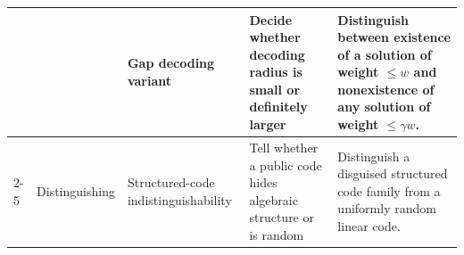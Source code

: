 \documentclass[11pt]{article}
\begin{document}
\begin{center}
\begin{tabular}{|p{2.1cm}|p{1.8cm}|p{3.3cm}|p{3.8cm}|p{4.9cm}|}
			& & Gap decoding variant
			& Decide whether decoding radius is small or definitely larger
			& Distinguish between existence of a solution of weight $\le w$ and nonexistence of any solution of weight $\le \gamma w$. \\
			\cline{2-5}
			
			& Distinguishing
			& Structured-code indistinguishability
			& Tell whether a public code hides algebraic structure or is random
			& Distinguish a disguised structured code family from a uniformly random linear code. \\
			\hline
			
%			
%			
%			
%			
%			
			

\end{tabular}
\end{center}
\end{document}
